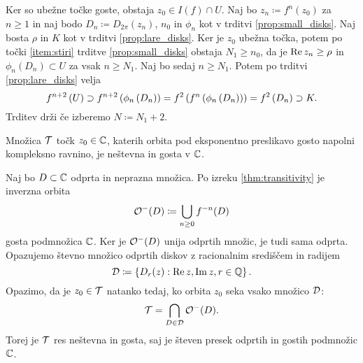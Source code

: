 \begin{dokaz}
    Ker so ubežne točke goste, obstaja \(z_0 \in I (f) \cap U\). Naj bo \(z_n \coloneq f^n (z_0)\) za \(n \geq 1\) in naj bodo \(D_n \coloneq D_{2 \pi} (z_n)\), \(n_0\) in \(\phi_n\) kot v trditvi \ref{prop:small_disks}. Naj bosta \(\rho\) in \(K\) kot v trditvi \ref{prop:lare_disks}. Ker je \(z_0\) ubežna točka, potem po točki \ref{item:stiri} trditve \ref{prop:small_disks} obstaja \(N_1 \geq n_0\), da je \(\operatorname{Re} z_n \geq \rho\) in \(\phi_n (D_n) \subset U\) za vsak \(n \geq N_1\). Naj bo sedaj \(n \geq N_1\). Potem po trditvi \ref{prop:lare_disks} velja
    \[f^{n + 2} \left( U \right) \supset f^{n + 2} \left( \phi_n \left( D_n \right) \right) = f^2 \left( f^n \left( \phi_n \left( D_n \right) \right) \right) = f^2 \left( D_n \right) \supset K.\]
    Trditev drži če izberemo \(N \coloneq N_1 + 2\).
\end{dokaz}

\begin{posledica}
    Množica \(\mathcal T\) točk \(z_0 \in \mathbb C\), katerih orbita pod eksponentno preslikavo gosto napolni kompleksno ravnino, je neštevna in gosta v \(\mathbb C\).
\end{posledica}

\begin{dokaz}
    Naj bo \(D \subset \mathbb C\) odprta in neprazna množica. Po izreku \ref{thm:transitivity} je inverzna orbita
    \[\mathcal O^- (D) \coloneq \bigcup_{n \geq 0} f^{- n} (D)\]
    gosta podmnožica \(\mathbb C\). Ker je \(\mathcal O^- (D)\) unija odprtih množic, je tudi sama odprta. Opazujemo števno množico odprtih diskov z racionalnim središčem in radijem
    \[\mathcal D \coloneq \left\{ D_r (z) : \operatorname{Re} z, \operatorname{Im} z, r \in \mathbb Q \right\}.\]
    Opazimo, da je \(z_0 \in \mathcal T\) natanko tedaj, ko orbita \(z_0\) seka vsako množico \(\mathcal D\):
    \[\mathcal T = \bigcap_{D \in \mathcal D} \mathcal O^- (D).\]
    Torej je \(\mathcal T\) res neštevna in gosta, saj je števen presek odprtih in gostih podmnožic \(\mathbb C\).
\end{dokaz}